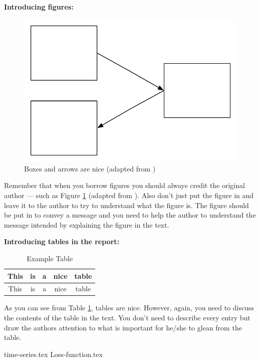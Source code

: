 \vspace{0.5cm}

\noindent
{\bf Introducing figures:} \\

\begin{figure}[ht]
    \begin{center}
        \includegraphics[width=0.5\columnwidth]{figs/figure1.pdf}
        \caption[Boxes and arrows are nice]{Boxes and arrows are nice (adapted from \citet{Bandara2019})}
        \label{fig:BoxesAndArrowsAreNice}
    \end{center}
\end{figure}
\begin{tcolorbox}[width=\linewidth, sharp corners=all, colback=white!96!black]

    Remember that when you borrow figures you should always credit the original author --- such as Figure \ref{fig:BoxesAndArrowsAreNice} (adapted from \citet{Bandara2019}). Also don't just put the figure in and leave it to the author to try to understand what the figure is. The figure should be put in to convey a message and you need to help the author to understand the message intended by explaining the figure in the text.
\end{tcolorbox}

\vspace{0.5cm}

\noindent
{\bf Introducing tables in the report: }\\

\begin{table}[htbp]
    \begin{center}
        \begin{tabular}{|c|c|c|c|c|}\hline\hline
            This & is & a & nice & table \\\hline
            This & is & a & nice & table \\\hline\hline
        \end{tabular}
        \caption{Example Table}
    \end{center}
    \label{tab:ExampleTable}
\end{table}%

\begin{tcolorbox}[width=\linewidth, sharp corners=all, colback=white!96!black]
    As you can see from Table \ref{tab:ExampleTable}, tables are nice. However, again, you need to discuss the contents of the table in the text. You don't need to describe every entry but draw the authors attention to what is important for he/she to glean from the table.
\end{tcolorbox}

{time-series.tex}
{Loss-function.tex}
